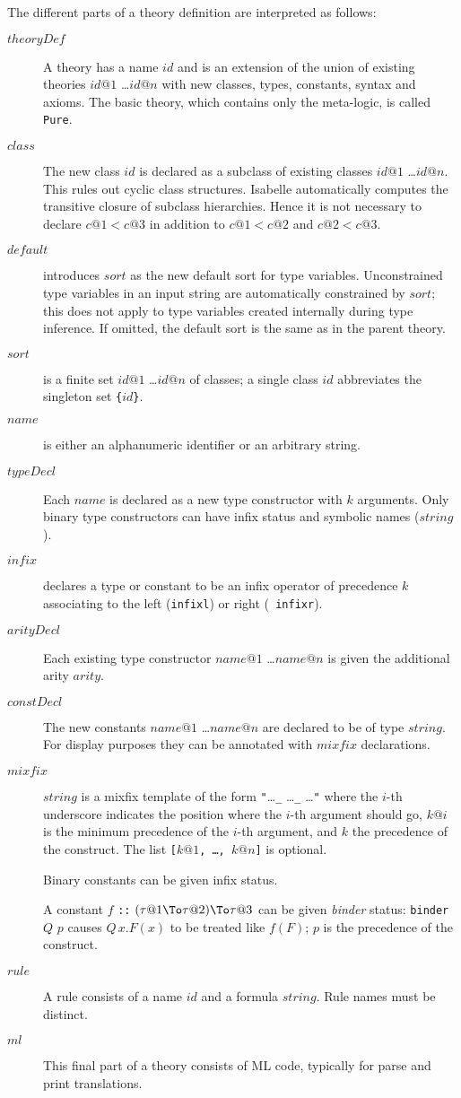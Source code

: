 The different parts of a theory definition are interpreted as follows:
\begin{description}
\item[$theoryDef$] A theory has a name $id$ and is an extension of the union
  of existing theories $id@1$ \dots $id@n$ with new classes, types,
  constants, syntax and axioms.  The basic theory, which contains only the
  meta-logic, is called {\tt Pure}.
\item[$class$] The new class $id$ is declared as a subclass of existing
  classes $id@1$ \dots $id@n$.  This rules out cyclic class structures.
  Isabelle automatically computes the transitive closure of subclass
  hierarchies.  Hence it is not necessary to declare $c@1 < c@3$ in addition
  to $c@1 < c@2$ and $c@2 < c@3$.
\item[$default$] introduces $sort$ as the new default sort for type
  variables.  Unconstrained type variables in an input string are
  automatically constrained by $sort$; this does not apply to type variables
  created internally during type inference.  If omitted,
  the default sort is the same as in the parent theory.
\item[$sort$] is a finite set $id@1$ \dots $id@n$ of classes; a single class
  $id$ abbreviates the singleton set {\tt\{}$id${\tt\}}.
\item[$name$] is either an alphanumeric identifier or an arbitrary string.
\item[$typeDecl$] Each $name$ is declared as a new type constructor with
  $k$ arguments.  Only binary type constructors can have infix status and
  symbolic names ($string$).
\item[$infix$] declares a type or constant to be an infix operator of
  precedence $k$ associating to the left ({\tt infixl}) or right ({\tt
    infixr}).
\item[$arityDecl$] Each existing type constructor $name@1$ \dots $name@n$
  is given the additional arity $arity$.
\item[$constDecl$] The new constants $name@1$ \dots $name@n$ are declared to
  be of type $string$.  For display purposes they can be annotated with
  $mixfix$ declarations.
\item[$mixfix$] $string$ is a mixfix template of the form {\tt"}\dots{\tt\_}
  \dots{\tt\_} \dots{\tt"} where the $i$-th underscore indicates the position
  where the $i$-th argument should go, $k@i$ is the minimum precedence of
  the $i$-th argument, and $k$ the precedence of the construct.  The list
  \hbox{\tt[$k@1$, \dots, $k@n$]} is optional.

  Binary constants can be given infix status.

  A constant $f$ {\tt::} $(\tau@1\To\tau@2)\To\tau@3$ can be given {\em
    binder} status: {\tt binder} $Q$ $p$ causes $Q\,x.F(x)$ to be treated
  like $f(F)$; $p$ is the precedence of the construct.
\item[$rule$] A rule consists of a name $id$ and a formula $string$.  Rule
  names must be distinct.
\item[$ml$] This final part of a theory consists of ML code, 
  typically for parse and print translations.
\end{description}
